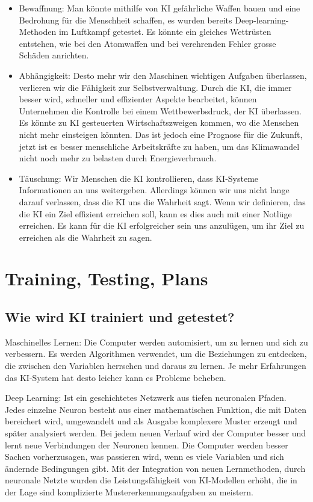\documentclass{report}
\begin{document}
\begin{itemize}
    \item Bewaffnung: Man könnte mithilfe von KI gefährliche Waffen bauen und eine Bedrohung für die Menschheit schaffen, es wurden bereits Deep-learning-Methoden im Luftkampf getestet. Es könnte ein gleiches Wettrüsten entstehen, wie bei den Atomwaffen und bei verehrenden Fehler grosse Schäden anrichten.
    \item Abhängigkeit: Desto mehr wir den Maschinen wichtigen Aufgaben überlassen, verlieren wir die Fähigkeit zur Selbstverwaltung. Durch die KI, die immer besser wird, schneller und effizienter Aspekte bearbeitet, können Unternehmen die Kontrolle bei einem Wettbewerbsdruck, der KI überlassen. Es könnte zu KI gesteuerten Wirtschaftszweigen kommen, wo die Menschen nicht mehr einsteigen könnten. Das ist jedoch eine Prognose für die Zukunft, jetzt ist es besser menschliche Arbeitskräfte zu haben, um das Klimawandel nicht noch mehr zu belasten  durch Energieverbrauch.
    \item Täuschung: Wir Menschen die KI kontrollieren, dass KI-Systeme Informationen an uns weitergeben. Allerdings können wir uns nicht lange darauf verlassen, dass die KI uns die Wahrheit sagt. Wenn wir definieren, das die KI ein Ziel effizient erreichen soll, kann es dies auch mit einer Notlüge erreichen. Es kann für die KI erfolgreicher sein uns anzulügen, um ihr Ziel zu erreichen als die Wahrheit zu sagen. 
\end{itemize}


\chapter{Training, Testing, Plans}

\section{Wie wird KI trainiert und getestet?}

Maschinelles Lernen:
Die Computer werden automisiert, um zu lernen und sich zu verbessern. Es werden Algorithmen verwendet, um die Beziehungen zu entdecken, die zwischen den Variablen herrschen und daraus zu lernen. Je mehr Erfahrungen das KI-System hat desto leicher kann es Probleme beheben.

Deep Learning:
Ist ein geschichtetes Netzwerk aus tiefen neuronalen Pfaden. Jedes einzelne Neuron besteht aus einer mathematischen Funktion, die mit Daten bereichert wird, umgewandelt und als Ausgabe komplexere Muster erzeugt und später analysiert werden.
Bei jedem neuen Verlauf wird der Computer besser und lernt neue Verbindungen der Neuronen kennen. Die Computer werden besser Sachen vorherzusagen, was passieren wird, wenn es viele Variablen und sich ändernde Bedingungen gibt. 
Mit der Integration von neuen Lernmethoden, durch neuronale Netzte wurden die Leistungsfähigkeit von KI-Modellen erhöht, die in der Lage sind komplizierte Mustererkennungsaufgaben zu meistern.
\end{document}
